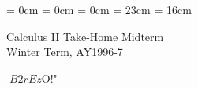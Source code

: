 

\topmargin = 0cm
\oddsidemargin = 0cm \evensidemargin = 0cm
\textheight = 23cm \textwidth = 16cm

\pagestyle{empty}


\begin{center}
{\gt\LARGE Calculus II  Take-Home Midterm}\\
{\gt Winter Term, AY1996-7}
\end{center}

\bigskip
\noindent
$B2rEz$O!"%

